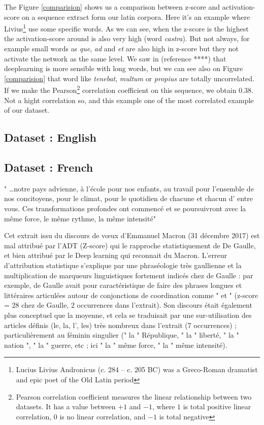 The Figure \ref{comparision} shows us a comparison between z-score and activation-score on a sequence extract form our latin corpora. Here it's an example where Livius\footnote{Lucius Livius Andronicus (c. 284 – c. 205 BC) was a Greco-Roman dramatist and epic poet of the Old Latin period} use some specific words. As we can see, when the z-score is the highest the activation-score around is also very high (word \textit{castra}). But not always, for example small words as \textit{que}, \textit{ad} and \textit{et} are also high in z-score but they not activate the network as the same level. We saw in (reference ****) that deeplearning is more sensible with long words, but we can see also on Figure \ref{comparision} that word like \textit{tenebat}, \textit{multum} or \textit{propius} are totally uncorrelated. If we make the Pearson\footnote{Pearson correlation coefficient measures the linear relationship between two datasets. It has a value between $+1$ and $-1$, where $1$ is total positive linear correlation, $0$ is no linear correlation, and $-1$ is total negative} correlation coefficient on this sequence, we obtain 0.38. Not a hight correlation so, and this example one of the most correlated example of our dataset.

\subsection{Dataset : English}


\subsection{Dataset : French}

" …notre pays advienne, à l'école pour nos enfants, au travail pour l'ensemble de nos concitoyens, pour le climat, pour le quotidien de chacune et chacun d' entre vous. Ces transformations profondes ont commencé et se poursuivront avec la même force, le même rythme, la même intensité"

Cet extrait issu du discours de vœux d'Emmanuel Macron (31 décembre 2017) est mal attribué par l'ADT (Z-score) qui le rapproche statistiquement de De Gaulle, et bien attribué par le Deep learning qui reconnait du Macron.
L'erreur d'attribution statistique s'explique par une phraséologie très gaullienne et la multiplication de marqueurs linguistiques fortement indicés chez de Gaulle : par exemple, de Gaulle avait pour caractéristique de faire des phrases longues et littéraires articulées autour de conjonctions de coordination  comme " et " (z-score = 28 chez de Gaulle, 2 occurrences dans l'extrait). Son discours était également plus conceptuel que la moyenne, et cela se traduisait par une sur-utilisation des articles définis (le, la, l', les) très nombreux dans  l'extrait (7 occurrences) ; particulièrement au féminin singulier (" la " République, " la " liberté, " la " nation ", " la " guerre, etc ; ici " la " même force, " la " même intensité).

